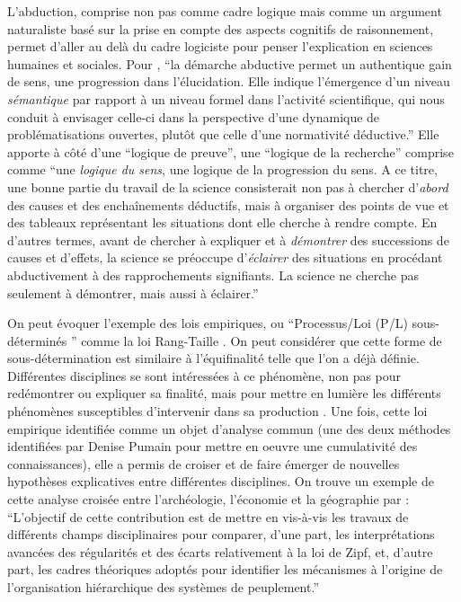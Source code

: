 L'abduction, comprise non pas comme cadre logique mais comme un argument naturaliste basé sur la prise en compte des aspects cognitifs de raisonnement, permet d'aller au delà du cadre logiciste pour penser l'explication en sciences humaines et sociales. Pour \textcite{Besse2000}, \enquote{la démarche abductive permet un authentique gain de sens, une progression dans l'élucidation. Elle indique l'émergence d'un niveau \textit{sémantique} par rapport à un niveau formel dans l'activité scientifique, qui nous conduit à envisager celle-ci dans la perspective d'une dynamique de problématisations ouvertes, plutôt que celle d'une normativité déductive.} Elle apporte à côté d'une \enquote{logique de preuve}, une \enquote{logique de la recherche} comprise comme \enquote{une \textit{logique du sens}, une logique de la progression du sens. A ce titre, une bonne partie du travail de la science consisterait non pas à chercher d'\textit{abord} des causes et des enchaînements déductifs, mais à organiser des points de vue et des tableaux représentant les situations dont elle cherche à rendre compte. En d'autres termes, avant de chercher à expliquer et à \textit{démontrer} des successions de causes et d'effets, la science se préoccupe d'\textit{éclairer} des situations en procédant abductivement à des rapprochements signifiants. La science ne cherche pas seulement à démontrer, mais aussi à éclairer.}

On peut évoquer l'exemple des lois empiriques, ou \enquote{Processus/Loi (P/L) sous-déterminés } comme la loi Rang-Taille \autocite{Varenne2014}. On peut considérer que cette forme de sous-détermination est similaire à l'équifinalité telle que l'on a déjà définie. Différentes disciplines se sont intéressées à ce phénomène, non pas pour redémontrer ou expliquer sa finalité, mais pour mettre en lumière les différents phénomènes susceptibles d'intervenir dans sa production . Une fois, cette loi empirique identifiée comme un objet d'analyse commun (une des deux méthodes identifiées par Denise Pumain pour mettre en oeuvre une cumulativité des connaissances), elle a permis de croiser et de faire émerger de nouvelles hypothèses explicatives entre différentes disciplines. On trouve un exemple de cette analyse croisée entre l'archéologie, l'économie et la géographie par \textcite{Sanders2012} : \enquote{L’objectif de cette contribution est de mettre en vis-à-vis les travaux de différents champs disciplinaires pour comparer, d’une part, les interprétations avancées des régularités et des écarts relativement à la loi de Zipf, et, d’autre part, les cadres théoriques adoptés pour identifier les mécanismes à l’origine de l’organisation hiérarchique des systèmes de peuplement.}

